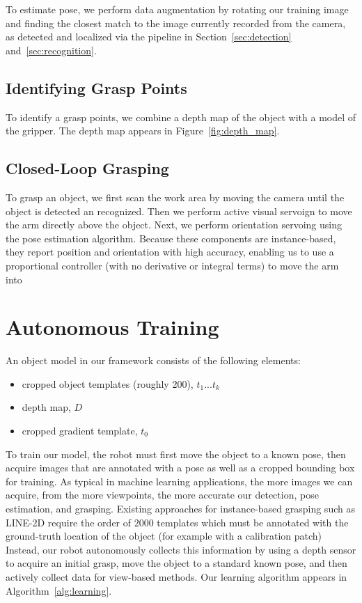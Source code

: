 \documentclass[conference]{IEEEtran}
\begin{document}
To estimate pose, we perform data augmentation by rotating our
training image and finding the closest match to the image currently
recorded from the camera, as detected and localized via the pipeline
in Section~\ref{sec:detection} and~\ref{sec:recognition}.

\subsection{Identifying Grasp Points}

To identify a grasp points, we combine a depth map of the object with
a model of the gripper.  The depth map appears in
Figure~\ref{fig:depth_map}.

\subsection{Closed-Loop Grasping}

To grasp an object, we first scan the work area by moving the camera
until the object is detected an recognized.  Then we perform active
visual servoign to move the arm directly above the object.  Next, we
perform orientation servoing using the pose estimation
algorithm. Because these components are instance-based, they report
position and orientation with high accuracy, enabling us to use a
proportional controller (with no derivative or integral terms) to move
the arm into





\section{Autonomous Training}
\label{sec:training}

An object model in our framework consists of the following elements:
\begin{itemize}
\item cropped object templates (roughly 200), $t_1 ... t_k$
\item depth map, $D$
\item cropped gradient template, $t_0$
\end{itemize}

To train our model, the robot must first move the object to a known
pose, then acquire images that are annotated with a pose as well as a
cropped bounding box for training.  As typical in machine learning
applications, the more images we can acquire, from the more
viewpoints, the more accurate our detection, pose estimation, and
grasping.  Existing approaches for instance-based grasping such as
LINE-2D require the order of $2000$ templates which must be annotated
with the ground-truth location of the object (for example with a
calibration patch)~\citep{hinterstoisser12} Instead, our robot
autonomously collects this information by using a depth sensor to
acquire an initial grasp, move the object to a standard known pose,
and then actively collect data for view-based methods.  Our learning
algorithm appears in Algorithm~\ref{alg:learning}.
\end{document}
